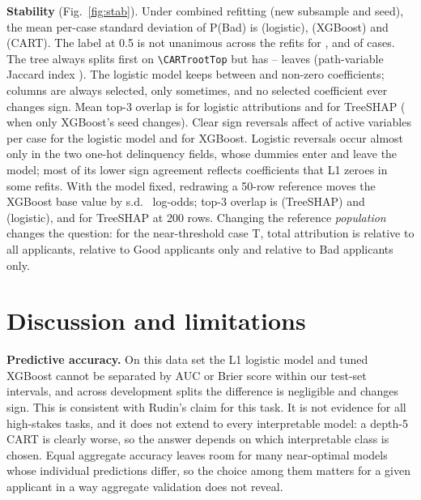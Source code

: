 \documentclass[11pt,a4paper]{article}
\newcommand{\var}[1]{{\small\nolinkurl{#1}}}
\begin{document}
\textbf{Stability} (Fig.~\ref{fig:stab}). Under combined refitting (new subsample and seed), the mean per-case standard deviation of P(Bad) is \PredSDRtLR{} (logistic), \PredSDRtXGB{} (XGBoost) and \PredSDRtCART{} (CART). The label at 0.5 is not unanimous across the \NRuns{} refits for \FlipRtLR{}, \FlipRtXGB{} and \FlipRtCART{} of cases. The tree always splits first on \var{\CARTrootTop} but has \CARTleavesMin{}--\CARTleavesMax{} leaves (path-variable Jaccard index \PathJacRtCART{}). The logistic model keeps between \LRnnzMin{} and \LRnnzMax{} non-zero coefficients; \LRalways{} columns are always selected, \LRsometimes{} only sometimes, and no selected coefficient ever changes sign. Mean top-3 overlap is \TopThreeRtLR{} for logistic attributions and \TopThreeRtXGB{} for TreeSHAP (\TopThreeSdXGB{} when only XGBoost's seed changes). Clear sign reversals affect \ConflictRtLR{} of active variables per case for the logistic model and \ConflictRtXGB{} for XGBoost. Logistic reversals occur almost only in the two one-hot delinquency fields, whose dummies enter and leave the model; most of its lower sign agreement reflects coefficients that L1 zeroes in some refits. With the model fixed, redrawing a 50-row reference moves the XGBoost base value by s.d.\ \BgBaseSDFiftyXGB{} log-odds; top-3 overlap is \TopThreeBgFiftyXGB{} (TreeSHAP) and \TopThreeBgFiftyLR{} (logistic), and \TopThreeBgTwoXGB{} for TreeSHAP at 200 rows. Changing the reference \emph{population} changes the question: for the near-threshold case T, total attribution is \SwapTAll{} relative to all applicants, \SwapTGood{} relative to Good applicants only and \SwapTBad{} relative to Bad applicants only.

\FloatBarrier

\FloatBarrier
\section{Discussion and limitations}\label{sec:disc}
\textbf{Predictive accuracy.} On this data set the L1 logistic model and tuned XGBoost cannot be separated by AUC or Brier score within our test-set intervals, and across development splits the difference is negligible and changes sign. This is consistent with Rudin's claim for this task. It is not evidence for all high-stakes tasks, and it does not extend to every interpretable model: a depth-5 CART is clearly worse, so the answer depends on which interpretable class is chosen. Equal aggregate accuracy leaves room for many near-optimal models whose individual predictions differ, so the choice among them matters for a given applicant in a way aggregate validation does not reveal.
\end{document}
